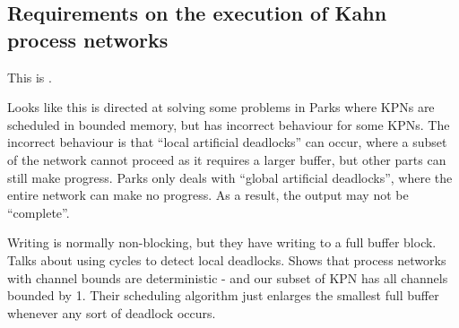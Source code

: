\subsection{Requirements on the execution of Kahn process networks}
This is \cite{geilen2003requirements}.

Looks like this is directed at solving some problems in Parks\cite{parks1995bounded} where KPNs are scheduled in bounded memory, but has incorrect behaviour for some KPNs.
The incorrect behaviour is that ``local artificial deadlocks'' can occur, where a subset of the network cannot proceed as it requires a larger buffer, but other parts can still make progress.
Parks only deals with ``global artificial deadlocks'', where the entire network can make no progress.
As a result, the output may not be ``complete''.

Writing is normally non-blocking, but they have writing to a full buffer block.
Talks about using cycles to detect local deadlocks. 
Shows that process networks with channel bounds are deterministic - and our subset of KPN has all channels bounded by 1.
Their scheduling algorithm just enlarges the smallest full buffer whenever any sort of deadlock occurs.

